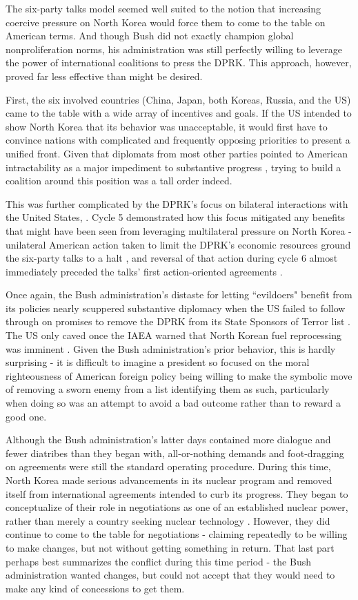 \documentclass{article}
\begin{document}
The six-party talks model seemed well suited to the notion that increasing coercive pressure on North Korea would force them to come to the table on American terms. And though Bush did not exactly champion global nonproliferation norms, his administration was still perfectly willing to leverage the power of international coalitions to press the DPRK. This approach, however, proved far less effective than might be desired.

First, the six involved countries (China, Japan, both Koreas, Russia, and the US) came to the table with a wide array of incentives and goals. If the US intended to show North Korea that its behavior was unacceptable, it would first have to convince nations with complicated and frequently opposing priorities to present a unified front. Given that diplomats from most other parties pointed to American intractability as a major impediment to substantive progress \cite{park6pt}, trying to build a coalition around this position was a tall order indeed.

This was further complicated by the DPRK's focus on bilateral interactions with the United States, \cite{rich14,park6pt}. Cycle 5 demonstrated how this focus mitigated any benefits that might have been seen from leveraging multilateral pressure on North Korea - unilateral American action taken to limit the DPRK's economic resources ground the six-party talks to a halt \cite{greenlees}, and reversal of that action during cycle 6 almost immediately preceded the talks' first action-oriented agreements \cite{js5,js6}. 

Once again, the Bush administration's distaste for letting ``evildoers" benefit from its policies nearly scuppered substantive diplomacy when the US failed to follow through on promises to remove the DPRK from its State Sponsors of Terror list \cite{nti15}. The US only caved once the IAEA warned that North Korean fuel reprocessing was imminent \cite{iaea09}. Given the Bush administration's prior behavior, this is hardly surprising - it is difficult to imagine a president so focused on the moral righteousness of American foreign policy being willing to make the symbolic move of removing a sworn enemy from a list identifying them as such, particularly when doing so was an attempt to avoid a bad outcome rather than to reward a good one.

Although the Bush administration's latter days contained more dialogue and fewer diatribes than they began with, all-or-nothing demands and foot-dragging on agreements were still the standard operating procedure. During this time, North Korea made serious advancements in its nuclear program and removed itself from international agreements intended to curb its progress. They began to conceptualize of their role in negotiations as one of an established nuclear power, rather than merely a country seeking nuclear technology \cite{hecker2}. However, they did continue to come to the table for negotiations - claiming repeatedly to be willing to make changes, but not without getting something in return. That last part perhaps best summarizes the conflict during this time period - the Bush administration wanted changes, but could not accept that they would need to make any kind of concessions to get them.
\end{document}
